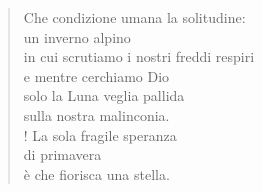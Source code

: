 
\begin{verse}
Che condizione umana la solitudine:\\
un inverno alpino\\
in cui scrutiamo i nostri freddi respiri\\
e mentre cerchiamo Dio\\
solo la Luna veglia pallida\\ 
sulla nostra malinconia.\\!
La sola fragile speranza\\
di primavera\\
è che fiorisca una stella.
\end{verse}